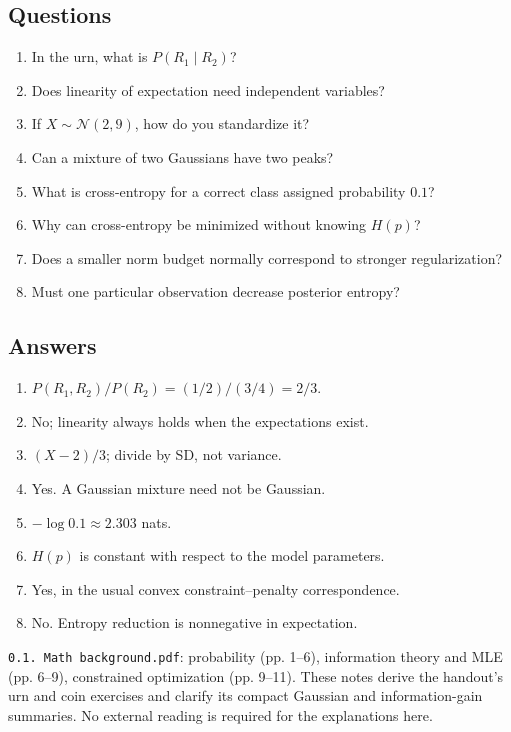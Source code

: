 \documentclass[11pt]{article}
\begin{document}
\subsection{Questions}
\begin{enumerate}
\item In the urn, what is $P(R_1\mid R_2)$?
\item Does linearity of expectation need independent variables?
\item If $X\sim\mathcal N(2,9)$, how do you standardize it?
\item Can a mixture of two Gaussians have two peaks?
\item What is cross-entropy for a correct class assigned probability $0.1$?
\item Why can cross-entropy be minimized without knowing $H(p)$?
\item Does a smaller norm budget normally correspond to stronger regularization?
\item Must one particular observation decrease posterior entropy?
\end{enumerate}
\subsection{Answers}
\begin{enumerate}
\item $P(R_1,R_2)/P(R_2)=(1/2)/(3/4)=2/3$.
\item No; linearity always holds when the expectations exist.
\item $(X-2)/3$; divide by SD, not variance.
\item Yes. A Gaussian mixture need not be Gaussian.
\item $-\log0.1\approx2.303$ nats.
\item $H(p)$ is constant with respect to the model parameters.
\item Yes, in the usual convex constraint--penalty correspondence.
\item No. Entropy reduction is nonnegative in expectation.
\end{enumerate}
\texttt{0.1. Math background.pdf}: probability (pp. 1--6), information theory and MLE (pp. 6--9), constrained optimization (pp. 9--11). These notes derive the handout's urn and coin exercises and clarify its compact Gaussian and information-gain summaries. No external reading is required for the explanations here.
\end{document}
